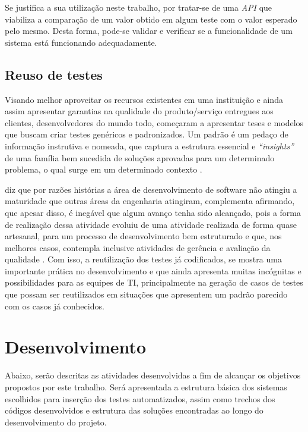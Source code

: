 \documentclass[tg]{mdtufsm}
\begin{document}
Se justifica a sua utilização neste trabalho, por tratar-se de uma \emph{API} que viabiliza a comparação de um valor obtido em algum teste com o valor esperado pelo mesmo. Desta forma, pode-se validar e verificar se a funcionalidade de um sistema está funcionando adequadamente.

\section{Reuso de testes}

Visando melhor aproveitar os recursos existentes em uma instituição e ainda assim apresentar garantias na qualidade do produto/serviço entregues aos clientes, desenvolvedores do mundo todo, começaram a apresentar
teses e modelos que buscam criar testes genéricos e padronizados. Um padrão é um pedaço de informação instrutiva e nomeada, que captura a estrutura essencial
e \emph{“insights”} de uma família bem sucedida de soluções aprovadas para um determinado problema, o qual surge em um determinado contexto \cite{cagnin2004reuso}.

\citeauthor{guizzardi2000desenvolvimento} diz que por razões histórias a área de desenvolvimento de software não atingiu a maturidade que outras áreas da engenharia atingiram, complementa afirmando,
que apesar disso, é inegável que algum avanço tenha sido alcançado, pois a forma de realização dessa atividade evoluiu de uma atividade realizada de forma quase artesanal, para um processo de
desenvolvimento bem estruturado e que, nos melhores casos, contempla inclusive atividades de gerência e avaliação da qualidade \cite{guizzardi2000desenvolvimento}.
Com isso, a reutilização dos testes já codificados, se mostra uma importante prática no desenvolvimento e que ainda apresenta muitas incógnitas e possibilidades para as equipes de TI,
principalmente na geração de casos de testes que possam ser reutilizados em situações que apresentem um padrão parecido com os casos já conhecidos.

\chapter{Desenvolvimento}

Abaixo, serão descritas as atividades desenvolvidas a fim de alcançar os objetivos propostos por este trabalho. Será apresentada a estrutura básica dos sistemas escolhidos para inserção dos testes automatizados, assim como trechos dos códigos desenvolvidos e estrutura das soluções encontradas ao longo do desenvolvimento do projeto.
\end{document}
